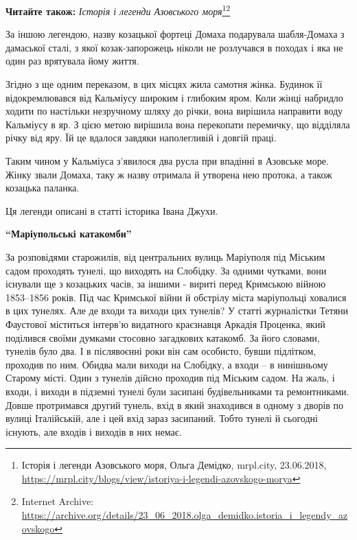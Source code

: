 \textbf{Читайте також:} \emph{Історія і легенди Азовського моря}\footnote{%
Історія і легенди Азовського моря, Ольга Демідко, mrpl.city, 23.06.2018, %
\url{https://mrpl.city/blogs/view/istoriya-i-legendi-azovskogo-morya}%
}\footnote{Internet Archive: \url{https://archive.org/details/23_06_2018.olga_demidko.istoria_i_legendy_azovskogo}}

За іншою легендою, назву козацької фортеці Домаха подарувала шабля-Домаха з
дамаської сталі, з якої козак-запорожець ніколи не розлучався в походах і яка
не один раз врятувала йому життя.

Згідно з ще одним переказом, в цих місцях жила самотня жінка. Будинок її
відокремлювався від Кальміусу широким і глибоким яром. Коли жінці набридло
ходити по настільки незручному шляху до річки, вона вирішила направити воду
Кальміусу в яр. З цією метою вирішила вона перекопати перемичку, що відділяла
річку від яру. Їй це вдалося завдяки наполегливій і довгій праці.

Таким чином у Кальміуса з'явилося два русла при впадінні в Азовське море. Жінку
звали Домаха, таку ж назву отримала й утворена нею протока, а також козацька
паланка.

Ця легенди описані в статті історика Івана Джухи.

\begin{center}
\bfseries\enquote{Маріупольські катакомби}	
\end{center}


За розповідями старожилів, від центральних вулиць Маріуполя під Міським садом
проходять тунелі, що виходять на Слобідку. За одними чутками, вони існували ще
з козацьких часів, за іншими - вириті перед Кримською війною 1853–1856 років.
Під час Кримської війни й обстрілу міста маріупольці ховалися в цих тунелях.
Але де входи та виходи цих тунелів? У статті журналістки Тетяни Фаустової
міститься інтерв'ю видатного краєзнавця Аркадія Проценка, який поділився своїми
думками стосовно загадкових катакомб. За його словами, тунелів було два. І в
післявоєнні роки він сам особисто, бувши підлітком, проходив по ним. Обидва
мали виходи на Слобідку, а входи – в нинішньому Старому місті. Один з тунелів
дійсно проходив під Міським садом. На жаль, і входи, і виходи в підземні тунелі
були засипані будівельниками та ремонтниками. Довше протримався другий тунель,
вхід в який знаходився в одному з дворів по вулиці Італійській, але і цей вхід
зараз засипаний. Тобто тунелі й сьогодні існують, але входів і виходів в них
немає.

